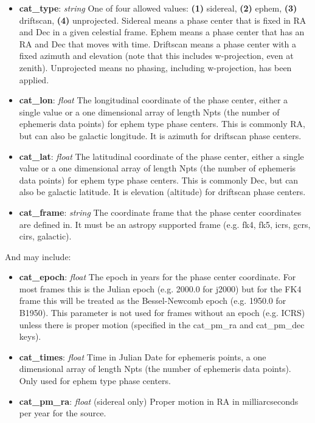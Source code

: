 \documentclass[11pt, oneside]{article}
\begin{document}
\begin{itemize}
\begin{itemize}
	  of phase centers that make up a mosaic observation.
	\item \textbf{cat\_type}: \textit{string} One of four allowed values:
	  \textbf{(1)} sidereal, \textbf{(2)} ephem, \textbf{(3)} driftscan,
	  \textbf{(4)} unprojected.
  	  Sidereal means a phase center that is fixed in RA and Dec in a given
	  celestial frame.
	  Ephem means a phase center that has an RA and Dec that
	  moves with time.
	  Driftscan means a phase center with a fixed azimuth and
	  elevation (note that this includes w-projection, even at zenith).
	  Unprojected means no phasing, including w-projection, has been applied.
  	\item \textbf{cat\_lon}: \textit{float}
	  The longitudinal coordinate of the phase center, either a single value or a
	  one dimensional array of length Npts (the number of ephemeris data points)
	  for ephem type phase centers.
	  This is commonly RA, but can also be galactic longitude. It is azimuth for
	  driftscan phase centers.
  	\item \textbf{cat\_lat}: \textit{float}
	  The latitudinal coordinate of the phase center, either a single value or a
	  one dimensional array of length Npts (the number of ephemeris data points)
	  for ephem type phase centers.
	  This is commonly Dec, but can also be galactic latitude. It is elevation (altitude)
	  for driftscan phase centers.
	\item \textbf{cat\_frame}: \textit{string} The coordinate frame that the
	  phase center coordinates are defined in. It must be an astropy
	  supported frame (e.g. fk4, fk5, icrs, gcrs, cirs, galactic).
	\end{itemize}
And may include:
	\begin{itemize}
	\item \textbf{cat\_epoch}: \textit{float} The epoch in years for the phase
	  center coordinate. For most frames this is the Julian epoch
	  (e.g. 2000.0 for j2000) but for the FK4 frame this will be treated as the
	  Bessel-Newcomb epoch (e.g. 1950.0 for B1950). This parameter is
	  not used for frames without an epoch (e.g. ICRS) unless there
	  is proper motion (specified in the cat\_pm\_ra and cat\_pm\_dec keys).
	\item \textbf{cat\_times}: \textit{float}
	  Time in Julian Date for ephemeris points, a one dimensional array of
	  length Npts (the number of ephemeris data points).
	  Only used for ephem type phase centers.
	\item \textbf{cat\_pm\_ra}: \textit{float} (sidereal only)
	  Proper motion in RA in milliarcseconds per year for the source.

\end{itemize}
\end{itemize}
\end{document}
